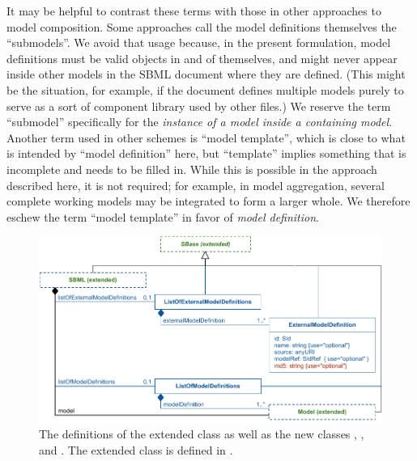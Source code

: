 % 

It may be helpful to contrast these terms with those in other
approaches to model composition.  Some approaches call the model
definitions themselves the ``submodels''.  We avoid that usage because,
in the present formulation, model definitions must be valid \Model
objects in and of themselves, and might never appear inside other models
in the SBML document where they are defined.  (This might be the
situation, for example, if the document defines multiple models purely
to serve as a sort of component library used by other files.)  We
reserve the term ``submodel'' specifically for the \emph{instance of a
  model inside a containing model}.  Another term used in other schemes
is ``model template'', which is close to what is intended by ``model
definition'' here, but ``template'' implies something that is incomplete
and needs to be filled in.  While this is possible in the approach
described here, it is not required; for example, in model aggregation,
several complete working models may be integrated to form a larger
whole.  We therefore eschew the term ``model template'' in favor of
\emph{model definition}.

\begin{figure}[b]
  \includegraphics{figs/hierarchical-sbml}
  \caption{The definitions of the extended \SBML class as well as the
    new classes \ListOfModelDefinitions,
    \ListOfExternalModelDefinitions, and \ExternalModelDefinition.  The
    extended \Model class is defined in .}
  \label{hierarchical-sbml-uml}
  \label{sbml-uml}
\end{figure}

